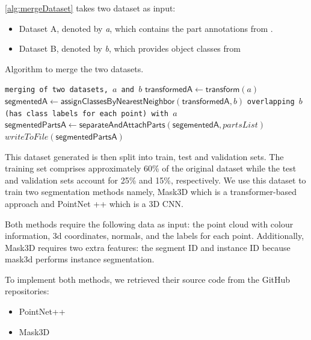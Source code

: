 \cref{alg:mergeDataset} takes two dataset as input: 
\begin{itemize}
  \item Dataset A, denoted by \textit{a}, which contains the part annotations from \cite{delitzas2024scenefun3d}.
  \item Dataset B, denoted by \textit{b}, which provides object classes from \cite{ji2024arkitlabelmakernewscale} 
\end{itemize}

\begin{Algorithmus} %
  \caption{Algorithm to merge the two datasets.}
  \label{alg:mergeDataset}
  \begin{algorithmic}
     \Comment \texttt{merging of two datasets, $a$ and $b$}
    \State $\mathsf{transformedA} \gets \mathsf{transform}(a) $ 
    \State $\mathsf{segmentedA} \gets \mathsf{assignClassesByNearestNeighbor}(\mathsf{transformedA}, b) $ 
    \State \Comment \texttt{overlapping $b$ (has class labels for each point) with $a$ }
    \State $\mathsf{segmentedPartsA} \gets \mathsf{separateAndAttachParts}(\mathsf{segementedA}, partsList)$ 
    \State $writeToFile(\mathsf{segmentedPartsA})$
    \EndProcedure
  \end{algorithmic}
\end{Algorithmus}

This dataset generated is then split into train, test and validation sets. The training set comprises approximately 60\% of the original dataset 
while the test and validation sets account for 25\% and 15\%, respectively. We use this dataset to train two segmentation methods 
namely, Mask3D which is a transformer-based approach and PointNet ++ which is a 3D CNN. 

Both methods require the following data as input: the point cloud with colour information, 3d coordinates, normals, 
and the labels for each point. Additionally, Mask3D requires two extra features: the segment ID and instance ID because 
mask3d performs instance segmentation. 

To implement both methods, we retrieved their source code from the GitHub repositories: 
\begin{itemize}
  \item PointNet++ \cite{Pytorch_Pointnet_Pointnet2}
  \item Mask3D \cite{Mask3D}
\end{itemize}
 
